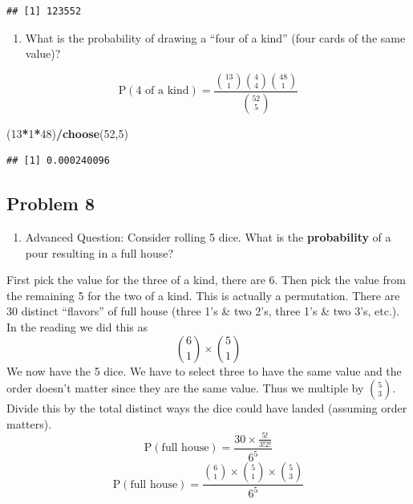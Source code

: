 \documentclass[
]{book}
\newenvironment{Shaded}{\begin{snugshade}}{\end{snugshade}}
\newcommand{\DecValTok}[1]{\textcolor[rgb]{0.00,0.00,0.81}{#1}}
\newcommand{\KeywordTok}[1]{\textcolor[rgb]{0.13,0.29,0.53}{\textbf{#1}}}
\newcommand{\NormalTok}[1]{#1}
\newcommand{\OperatorTok}[1]{\textcolor[rgb]{0.81,0.36,0.00}{\textbf{#1}}}
\providecommand{\tightlist}{%
  \setlength{\itemsep}{0pt}\setlength{\parskip}{0pt}}
\begin{document}
\begin{verbatim}
## [1] 123552
\end{verbatim}

\begin{enumerate}
\def\labelenumi{\alph{enumi}.}
\setcounter{enumi}{1}
\tightlist
\item
  What is the probability of drawing a ``four of a kind'' (four cards of the same value)?
\end{enumerate}

\[
\mbox{P}(\mbox{4 of a kind})=\frac{\binom{13}{1}\binom{4}{4}\binom{48}{1}}{\binom{52}{5}}
\]

\begin{Shaded}
\begin{Highlighting}[]
\NormalTok{(}\DecValTok{13}\OperatorTok{*}\DecValTok{1}\OperatorTok{*}\DecValTok{48}\NormalTok{)}\OperatorTok{/}\KeywordTok{choose}\NormalTok{(}\DecValTok{52}\NormalTok{,}\DecValTok{5}\NormalTok{)}
\end{Highlighting}
\end{Shaded}

\begin{verbatim}
## [1] 0.000240096
\end{verbatim}

\hypertarget{problem-8}{%
\subsection{Problem 8}\label{problem-8}}

\begin{enumerate}
\def\labelenumi{\arabic{enumi}.}
\setcounter{enumi}{7}
\tightlist
\item
  Advanced Question: Consider rolling 5 dice. What is the \textbf{probability} of a pour resulting in a full house?
\end{enumerate}

First pick the value for the three of a kind, there are 6. Then pick the value from the remaining 5 for the two of a kind. This is actually a permutation. There are 30 distinct ``flavors'' of full house (three 1's \& two 2's, three 1's \& two 3's, etc.). In the reading we did this as
\[
\binom{6}{1} \times \binom{5}{1}
\]
We now have the 5 dice. We have to select three to have the same value and the order doesn't matter since they are the same value. Thus we multiple by \(\binom{5}{3}\). Divide this by the total distinct ways the dice could have landed (assuming order matters).
\[
\mbox{P}(\mbox{full house}) = \frac{30 \times \frac{5!}{3!2!}}{6^5}
\]
\[
\mbox{P}(\mbox{full house}) = \frac{\binom{6}{1} \times \binom{5}{1} \times \binom{5}{3}}{6^5}
\]
\end{document}
